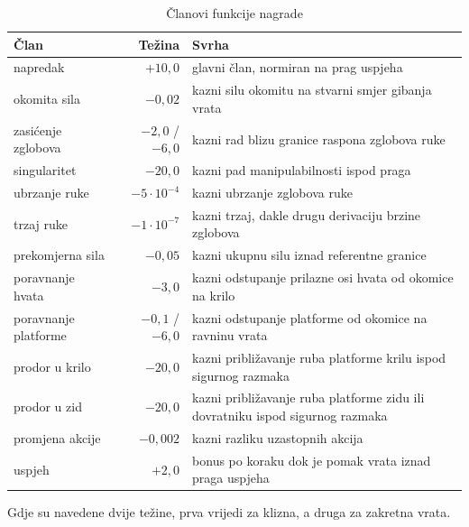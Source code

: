 \begin{table}[H]
    \centering
    \caption{Članovi funkcije nagrade}
    \label{tab:nagrada}
    \begin{tabular}{@{}p{}r p{}@{}}
        \toprule
        Član                 & Težina              & Svrha                                                                         \\
        \midrule
        napredak             & $+10{,}0$           & glavni član, normiran na prag uspjeha                                         \\
        okomita sila         & $-0{,}02$           & kazni silu okomitu na stvarni smjer gibanja vrata                             \\
        zasićenje zglobova   & $-2{,}0$ / $-6{,}0$ & kazni rad blizu granice raspona zglobova ruke                                 \\
        singularitet         & $-20{,}0$           & kazni pad manipulabilnosti ispod praga                                        \\
        ubrzanje ruke        & $-5 \cdot 10^{-4}$  & kazni ubrzanje zglobova ruke                                                  \\
        trzaj ruke           & $-1 \cdot 10^{-7}$  & kazni trzaj, dakle drugu derivaciju brzine zglobova                           \\
        prekomjerna sila     & $-0{,}05$           & kazni ukupnu silu iznad referentne granice                                    \\
        poravnanje hvata     & $-3{,}0$            & kazni odstupanje prilazne osi hvata od okomice na krilo                       \\
        poravnanje platforme & $-0{,}1$ / $-6{,}0$ & kazni odstupanje platforme od okomice na ravninu vrata                        \\
        prodor u krilo       & $-20{,}0$           & kazni približavanje ruba platforme krilu ispod sigurnog razmaka               \\
        prodor u zid         & $-20{,}0$           & kazni približavanje ruba platforme zidu ili dovratniku ispod sigurnog razmaka \\
        promjena akcije      & $-0{,}002$          & kazni razliku uzastopnih akcija                                               \\
        uspjeh               & $+2{,}0$            & bonus po koraku dok je pomak vrata iznad praga uspjeha                        \\
        \bottomrule
    \end{tabular}

    \vspace{2mm}
    {\footnotesize Gdje su navedene dvije težine, prva vrijedi za klizna, a druga za zakretna
        vrata.}
\end{table}

